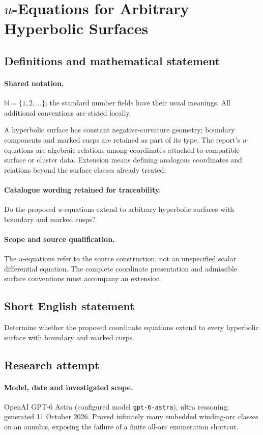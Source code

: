 \documentclass[11pt]{article}
\begin{document}
\section{$u$-Equations for Arbitrary Hyperbolic Surfaces}\label{statement}

\subsection{Definitions and mathematical statement}

\paragraph{Shared notation.}$\mathbb N=\{1,2,\ldots\}$; the standard number fields have their usual meanings. All additional conventions are stated locally.


A hyperbolic surface has constant negative-curvature geometry; boundary components and marked cusps are retained as part of its type. The report's $u$-equations are algebraic relations among coordinates attached to compatible surface or cluster data. Extension means defining analogous coordinates and relations beyond the surface classes already treated.

\paragraph{Catalogue wording retained for traceability.}
Do the proposed $u$-equations extend to arbitrary hyperbolic surfaces with boundary and marked cusps?

\paragraph{Scope and source qualification.}The $u$-equations refer to the source construction, not an unspecified scalar differential equation. The complete coordinate presentation and admissible surface conventions must accompany an extension.
\subsection{Short English statement}
Determine whether the proposed coordinate equations extend to every hyperbolic surface with boundary and marked cusps.
\subsection{Research attempt}
\paragraph{Model, date and investigated scope.}
OpenAI GPT-6 Astra (configured model \texttt{gpt-6-astra}), ultra reasoning; generated 11 October 2026. Proved infinitely many embedded winding-arc classes on an annulus, exposing the failure of a finite all-arc enumeration shortcut.
\end{document}

